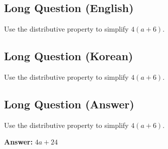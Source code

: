 \cleardoublepage
\subsection*{Long Question (English)}
Use the distributive property to simplify $4(a + 6)$.


\newpage
\subsection*{Long Question (Korean)}
Use the distributive property to simplify $4(a + 6)$.


\newpage
\subsection*{Long Question (Answer)}
Use the distributive property to simplify $4(a + 6)$.

\textbf{Answer:} $4a + 24$
